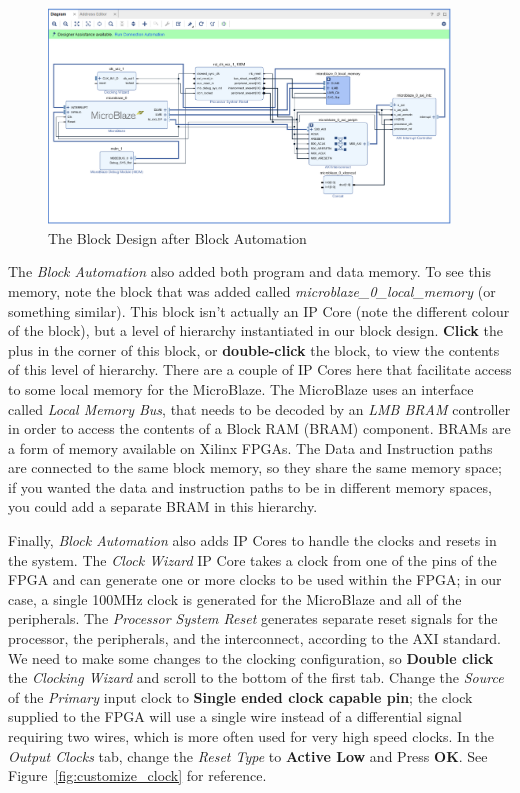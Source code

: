 \documentclass[11pt]{article}
\begin{document}
\begin{figure}[h]
    \centering
    \includegraphics[width=0.95\textwidth]{images/block_design_mb.png}
    \caption{The Block Design after Block Automation}
    \label{fig:block_design_mb}
\end{figure}

The \textit{Block Automation} also added both program and data memory. To see this memory, note the block that was added called \textit{microblaze\_0\_local\_memory} (or something similar). This block isn't actually an IP Core (note the different colour of the block), but a level of hierarchy instantiated in our block design. \textbf{Click} the plus in the corner of this block, or \textbf{double-click} the block, to view the contents of this level of hierarchy. There are a couple of IP Cores here that facilitate access to some local memory for the MicroBlaze. The MicroBlaze uses an interface called \textit{Local Memory Bus}, that needs to be decoded by an \textit{LMB BRAM} controller in order to access the contents of a Block RAM (BRAM) component. BRAMs are a form of memory available on Xilinx FPGAs. The Data and Instruction paths are connected to the same block memory, so they share the same memory space; if you wanted the data and instruction paths to be in different memory spaces, you could add a separate BRAM in this hierarchy.

Finally, \textit{Block Automation} also adds IP Cores to handle the clocks and resets in the system. The \textit{Clock Wizard} IP Core takes a clock from one of the pins of the FPGA and can generate one or more clocks to be used within the FPGA; in our case, a single 100MHz clock is generated for the MicroBlaze and all of the peripherals. The \textit{Processor System Reset} generates separate reset signals for the processor, the peripherals, and the interconnect, according to the AXI standard. We need to make some changes to the clocking configuration, so \textbf{Double click} the \textit{Clocking Wizard} and scroll to the bottom of the first tab. Change the \textit{Source} of the \textit{Primary} input clock to \textbf{Single ended clock capable pin}; the clock supplied to the FPGA will use a single wire instead of a differential signal requiring two wires, which is more often used for very high speed clocks. In the \textit{Output Clocks} tab, change the \textit{Reset Type} to \textbf{Active Low} and Press \textbf{OK}. See Figure~\ref{fig:customize_clock} for reference.
\end{document}
